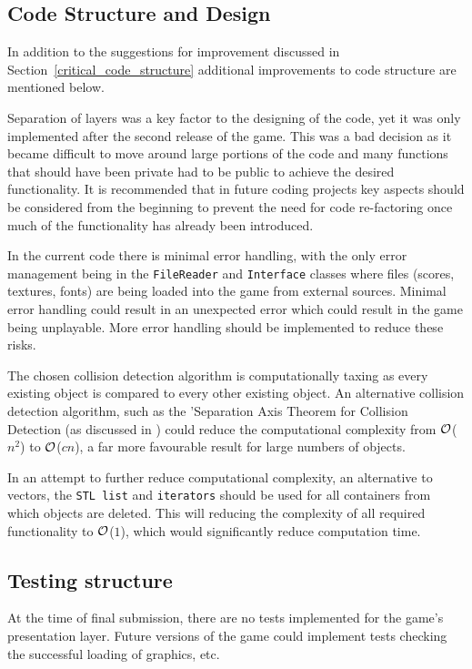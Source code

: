 \documentclass[10pt,twocolumn]{witseiepaper}
\begin{document}
\subsection{Code Structure and Design}\label{code_improvements}

In addition to the suggestions for improvement discussed in Section~\ref{critical_code_structure} additional improvements to code structure are mentioned below.

Separation of layers was a key factor to the designing of the code, yet it was only implemented after the second release of the game. This was a bad decision as it became difficult to move around large portions of the code and many functions that should have been private had to be public to achieve the desired functionality. It is recommended that in future coding projects key aspects should be considered from the beginning to prevent the need for code re-factoring once much of the functionality has already been introduced.

In the current code there is minimal error handling, with the only error management being in the \texttt{FileReader} and \texttt{Interface} classes where files (scores, textures, fonts) are being loaded into the game from external sources. Minimal error handling could result in an unexpected error which could result in the game being unplayable. More error handling should be implemented to reduce these risks.

The chosen collision detection algorithm is computationally taxing as every existing object is compared to every other existing object. An alternative collision detection algorithm, such as the 'Separation Axis Theorem for Collision Detection (as discussed in \cite{Collision_detection}) could reduce the computational complexity from $\cal{O}$($n^{2}$) to $\cal{O}$($cn$), a far more favourable result for large numbers of objects.

In an attempt to further reduce computational complexity, an alternative to vectors, the \texttt{STL list} and \texttt{iterators} should be used for all containers from which objects are deleted. This will reducing the complexity of all required functionality to $\cal{O}$($1$), which would significantly reduce computation time.


\subsection{Testing structure}
At the time of final submission, there are no tests implemented for the game's presentation layer. Future versions of the game could implement tests checking the successful loading of graphics, etc.
\end{document}
